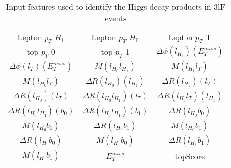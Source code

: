 \begin{table}[H]
  \begin{center}
  \begin{tabular}{ccc}
    \hline\hline
    Lepton  $p_T$ $H_1$ & Lepton  $p_T$ $H_0$ & Lepton  $p_T$ T \\
    top  $p_T$ 0 & top  $p_T$ 1 & $\Delta\phi(l_{H_1})(E_T^{miss})$ \\
    $\Delta\phi(l_{T})(E_T^{miss})$ & $M(l_{H_0}l_{H_1})$ & $M(l_{H_1}l_{T})$ \\
    $M(l_{H_0}l_{T})$ & $\Delta R(l_{H_0})(l_{H_1})$ & $\Delta R(l_{H_1})(l_{T})$ \\
    $\Delta R(l_{H_0})(l_{T})$ & $\Delta R(l_{H_0}l_{H_1})(l_{T})$ & $\Delta R(l_{H_0}l_{T})(l_{H_1})$ \\
    $\Delta R(l_{H_0}l_{H_1})(b_0)$ & $\Delta R(l_{H_0}l_{H_1})(b_1)$ & $\Delta R(l_{H_0}b_0)$ \\
    $M(l_{H_0}b_0)$ & $\Delta R(l_{H_0}b_1)$ & $M(l_{H_0}b_1)$ \\
    $\Delta R(l_{H_1}b_0)$ & $M(l_{H_1}b_0)$ & $\Delta R(l_{H_1}b_1)$ \\
    $M(l_{H_1}b_1)$ & $E_T^{miss}$ & topScore \\
    \hline
  \end{tabular}
  \end{center}
  \caption{Input features used to identify the Higgs decay products in 3lF events}
  \label{tab:higgsTop3lFfeatures}
\end{table}
